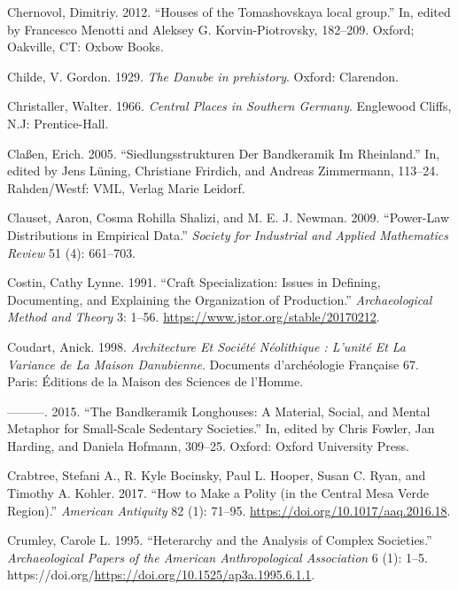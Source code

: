 \documentclass[
  12pt,
  a4paper, twoside]{book}
\newlength{\cslhangindent}
\newlength{\cslentryspacingunit} %
\newenvironment{CSLReferences}[2] %
 {%
  \setlength{\parindent}{0pt}
  \ifodd #1
  \let\oldpar\par
  \def\par{\hangindent=\cslhangindent\oldpar}
  \fi
  \setlength{\parskip}{#2\cslentryspacingunit}
 }%
 {}
\begin{document}
\begin{CSLReferences}{1}{0}
\leavevmode{}%
Chernovol, Dimitriy. 2012. {``Houses of the Tomashovskaya local group.''} In, edited by Francesco Menotti and Aleksey G. Korvin-Piotrovsky, 182--209. Oxford; Oakville, CT: Oxbow Books.

\leavevmode{}%
Childe, V. Gordon. 1929. \emph{The Danube in prehistory}. Oxford: Clarendon.

\leavevmode{}%
Christaller, Walter. 1966. \emph{Central Places in Southern {Germany}}. {Englewood Cliffs, N.J}: {Prentice-Hall}.

\leavevmode{}%
Claßen, Erich. 2005. {``Siedlungsstrukturen Der Bandkeramik Im Rheinland.''} In, edited by Jens Lüning, Christiane Frirdich, and Andreas Zimmermann, 113--24. Rahden/Westf: VML, Verlag Marie Leidorf.

\leavevmode{}%
Clauset, Aaron, Cosma Rohilla Shalizi, and M. E. J. Newman. 2009. {``Power-Law Distributions in Empirical Data.''} \emph{Society for Industrial and Applied Mathematics Review} 51 (4): 661--703.

\leavevmode{}%
Costin, Cathy Lynne. 1991. {``Craft Specialization: Issues in Defining, Documenting, and Explaining the Organization of Production.''} \emph{Archaeological Method and Theory} 3: 1--56. \url{https://www.jstor.org/stable/20170212}.

\leavevmode{}%
Coudart, Anick. 1998. \emph{Architecture Et Société Néolithique : L'unité Et La Variance de La Maison Danubienne}. Documents d'archéologie Française 67. Paris: Éditions de la Maison des Sciences de l'Homme.

\leavevmode{}%
---------. 2015. {``The Bandkeramik Longhouses: A Material, Social, and Mental Metaphor for Small-Scale Sedentary Societies.''} In, edited by Chris Fowler, Jan Harding, and Daniela Hofmann, 309--25. Oxford: Oxford University Press.

\leavevmode{}%
Crabtree, Stefani A., R. Kyle Bocinsky, Paul L. Hooper, Susan C. Ryan, and Timothy A. Kohler. 2017. {``How to Make a Polity (in the Central Mesa Verde Region).''} \emph{American Antiquity} 82 (1): 71--95. \url{https://doi.org/10.1017/aaq.2016.18}.

\leavevmode{}%
Crumley, Carole L. 1995. {``Heterarchy and the Analysis of Complex Societies.''} \emph{Archaeological Papers of the American Anthropological Association} 6 (1): 1--5. https://doi.org/\url{https://doi.org/10.1525/ap3a.1995.6.1.1}.


\end{CSLReferences}
\end{document}
